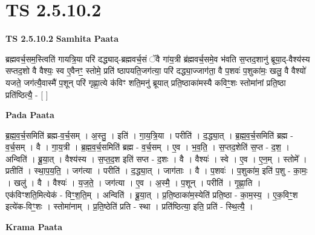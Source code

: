 \documentclass[17pt]{extarticle}
\begin{document}
\section{ TS 2.5.10.2 }

\textbf{TS 2.5.10.2 } \newline
\textbf{Samhita Paata} \newline

ब्रह्मवर्च॒सम॒स्त्विति॑ गायत्रि॒या परि॑ दद्ध्याद्-ब्रह्मवर्च॒सं ॅवै गा॑य॒त्री ब्र॑ह्मवर्च॒समे॒व भ॑वति स॒प्तद॒शानु॑ ब्रूया॒द्-वैश्य॑स्य सप्तद॒शो वै वैश्यः॒ स्व ए॒वैनꣳ॒॒ स्तोमे॒ प्रति॑ ष्ठापयति॒जग॑त्या॒ परि॑ दद्ध्या॒ज्जाग॑ता॒ वै प॒शवः॑ प॒शुका॑मः॒ खलु॒ वै वैश्यो॑ यजते॒ जग॑त्यै॒वास्मै॑ प॒शून् परि॑ गृह्णा॒त्ये क॑विꣳ शति॒मनु॑ ब्रूयात् प्रति॒ष्ठाका॑मस्यै कविꣳ॒॒शः स्तोमा॑नां प्रति॒ष्ठा प्रति॑ष्ठित्यै॒ - [  ] \newline

\textbf{Pada Paata} \newline

ब्र॒ह्म॒व॒र्च॒समिति॑ ब्रह्म-व॒र्च॒सम् । अ॒स्तु॒ । इति॑ । गा॒य॒त्रि॒या । परीति॑ । द॒द्ध्या॒त् । ब्र॒ह्म॒व॒र्च॒समिति॑ ब्रह्म - व॒र्च॒सम् । वै । गा॒य॒त्री । ब्र॒ह्म॒व॒र्च॒समिति॑ ब्रह्म - व॒र्च॒सम् । ए॒व । भ॒व॒ति॒ । स॒प्तद॒शेति॑ स॒प्त - द॒श॒ । अन्विति॑ । ब्रू॒या॒त् । वैश्य॑स्य । स॒प्त॒द॒श इति॑ सप्त - द॒शः । वै । वैश्यः॑ । स्वे । ए॒व । ए॒न॒म् । स्तोमे᳚ । प्रतीति॑ । स्था॒प॒य॒ति॒ । जग॑त्या । परीति॑ । द॒द्ध्या॒त् । जाग॑ताः । वै । प॒शवः॑ । प॒शुका॑म॒ इति॑ प॒शु - का॒मः॒ । खलु॑ । वै । वैश्यः॑ । य॒ज॒ते॒ । जग॑त्या । ए॒व । अ॒स्मै॒ । प॒शून् । परीति॑ । गृ॒ह्णा॒ति । एक॑विꣳशति॒मित्येक॑ - विꣳ॒॒श॒ति॒म् । अन्विति॑ । ब्रू॒या॒त् । प्र॒ति॒ष्ठाका॑म॒स्येति॑ प्रति॒ष्ठा - का॒म॒स्य॒ । ए॒क॒विꣳ॒॒श इत्ये॑क-विꣳ॒॒शः । स्तोमा॑नाम् । प्र॒ति॒ष्ठेति॑ प्रति - स्था । प्रति॑ष्ठित्या॒ इति॒ प्रति॑ - स्थि॒त्यै॒ ।  \newline


\textbf{Krama Paata} \newline
\end{document}
